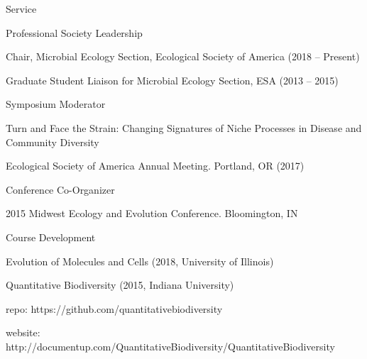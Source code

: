 \documentclass{resume} %
\begin{document}
\begin{rSection}{Service}
    \begin{rSubsection}{Professional Society Leadership}{}{}{}
        \item Chair, Microbial Ecology Section, Ecological Society of America (2018 -- Present)
        \item Graduate Student Liaison for Microbial Ecology Section, ESA (2013 -- 2015)
    \end{rSubsection}


    \begin{rSubsection}{Symposium Moderator}{}{}{}
        \item Turn and Face the Strain: Changing Signatures of Niche
        Processes in Disease and Community Diversity
			\item Ecological Society of America Annual Meeting. Portland, OR (2017)
    \end{rSubsection}

    \begin{rSubsection}{Conference Co-Organizer}{}{}{}
        \item 2015 Midwest Ecology and Evolution Conference.
				Bloomington, IN
    \end{rSubsection}

    \begin{rSubsection}{Course Development}{}{}{}
        \item Evolution of Molecules and Cells (2018, University of Illinois)
        \item Quantitative Biodiversity (2015, Indiana University)
        \item \hspace{2ex} repo: https://github.com/quantitativebiodiversity
        \item \hspace{2ex} website:
        http://documentup.com/QuantitativeBiodiversity/QuantitativeBiodiversity
    \end{rSubsection}

\end{rSection}
\end{document}
